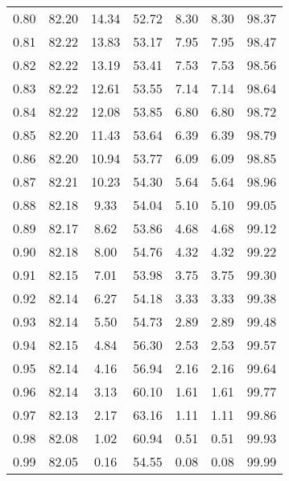 \begin{tabular}{|c|c|c|c|c|c|c|}
      0.80 &     82.20 &     14.34 &      52.72 &    8.30 &       8.30 &         98.37 \\
      0.81 &     82.22 &     13.83 &      53.17 &    7.95 &       7.95 &         98.47 \\
      0.82 &     82.22 &     13.19 &      53.41 &    7.53 &       7.53 &         98.56 \\
      0.83 &     82.22 &     12.61 &      53.55 &    7.14 &       7.14 &         98.64 \\
      0.84 &     82.22 &     12.08 &      53.85 &    6.80 &       6.80 &         98.72 \\
      0.85 &     82.20 &     11.43 &      53.64 &    6.39 &       6.39 &         98.79 \\
      0.86 &     82.20 &     10.94 &      53.77 &    6.09 &       6.09 &         98.85 \\
      0.87 &     82.21 &     10.23 &      54.30 &    5.64 &       5.64 &         98.96 \\
      0.88 &     82.18 &      9.33 &      54.04 &    5.10 &       5.10 &         99.05 \\
      0.89 &     82.17 &      8.62 &      53.86 &    4.68 &       4.68 &         99.12 \\
      0.90 &     82.18 &      8.00 &      54.76 &    4.32 &       4.32 &         99.22 \\
      0.91 &     82.15 &      7.01 &      53.98 &    3.75 &       3.75 &         99.30 \\
      0.92 &     82.14 &      6.27 &      54.18 &    3.33 &       3.33 &         99.38 \\
      0.93 &     82.14 &      5.50 &      54.73 &    2.89 &       2.89 &         99.48 \\
      0.94 &     82.15 &      4.84 &      56.30 &    2.53 &       2.53 &         99.57 \\
      0.95 &     82.14 &      4.16 &      56.94 &    2.16 &       2.16 &         99.64 \\
      0.96 &     82.14 &      3.13 &      60.10 &    1.61 &       1.61 &         99.77 \\
      0.97 &     82.13 &      2.17 &      63.16 &    1.11 &       1.11 &         99.86 \\
      0.98 &     82.08 &      1.02 &      60.94 &    0.51 &       0.51 &         99.93 \\
      0.99 &     82.05 &      0.16 &      54.55 &    0.08 &       0.08 &         99.99 \\
\bottomrule
\end{tabular}
